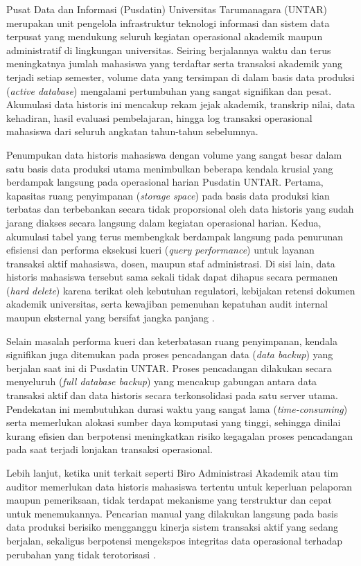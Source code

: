 Pusat Data dan Informasi (Pusdatin) Universitas Tarumanagara (UNTAR) merupakan unit pengelola infrastruktur teknologi informasi dan sistem data terpusat yang mendukung seluruh kegiatan operasional akademik maupun administratif di lingkungan universitas. Seiring berjalannya waktu dan terus meningkatnya jumlah mahasiswa yang terdaftar serta transaksi akademik yang terjadi setiap semester, volume data yang tersimpan di dalam basis data produksi (\textit{active database}) mengalami pertumbuhan yang sangat signifikan dan pesat. Akumulasi data historis ini mencakup rekam jejak akademik, transkrip nilai, data kehadiran, hasil evaluasi pembelajaran, hingga log transaksi operasional mahasiswa dari seluruh angkatan tahun-tahun sebelumnya.

Penumpukan data historis mahasiswa dengan volume yang sangat besar dalam satu basis data produksi utama menimbulkan beberapa kendala krusial yang berdampak langsung pada operasional harian Pusdatin UNTAR. Pertama, kapasitas ruang penyimpanan (\textit{storage space}) pada basis data produksi kian terbatas dan terbebankan secara tidak proporsional oleh data historis yang sudah jarang diakses secara langsung dalam kegiatan operasional harian. Kedua, akumulasi tabel yang terus membengkak berdampak langsung pada penurunan efisiensi dan performa eksekusi kueri (\textit{query performance}) untuk layanan transaksi aktif mahasiswa, dosen, maupun staf administrasi. Di sisi lain, data historis mahasiswa tersebut sama sekali tidak dapat dihapus secara permanen (\textit{hard delete}) karena terikat oleh kebutuhan regulatori, kebijakan retensi dokumen akademik universitas, serta kewajiban pemenuhan kepatuhan audit internal maupun eksternal yang bersifat jangka panjang \cite{zulkifli2011manajemen}.

Selain masalah performa kueri dan keterbatasan ruang penyimpanan, kendala signifikan juga ditemukan pada proses pencadangan data (\textit{data backup}) yang berjalan saat ini di Pusdatin UNTAR. Proses pencadangan dilakukan secara menyeluruh (\textit{full database backup}) yang mencakup gabungan antara data transaksi aktif dan data historis secara terkonsolidasi pada satu server utama. Pendekatan ini membutuhkan durasi waktu yang sangat lama (\textit{time-consuming}) serta memerlukan alokasi sumber daya komputasi yang tinggi, sehingga dinilai kurang efisien dan berpotensi meningkatkan risiko kegagalan proses pencadangan pada saat terjadi lonjakan transaksi operasional.

Lebih lanjut, ketika unit terkait seperti Biro Administrasi Akademik atau tim auditor memerlukan data historis mahasiswa tertentu untuk keperluan pelaporan maupun pemeriksaan, tidak terdapat mekanisme yang terstruktur dan cepat untuk menemukannya. Pencarian manual yang dilakukan langsung pada basis data produksi berisiko mengganggu kinerja sistem transaksi aktif yang sedang berjalan, sekaligus berpotensi mengekspos integritas data operasional terhadap perubahan yang tidak terotorisasi \cite{james2014database}.

